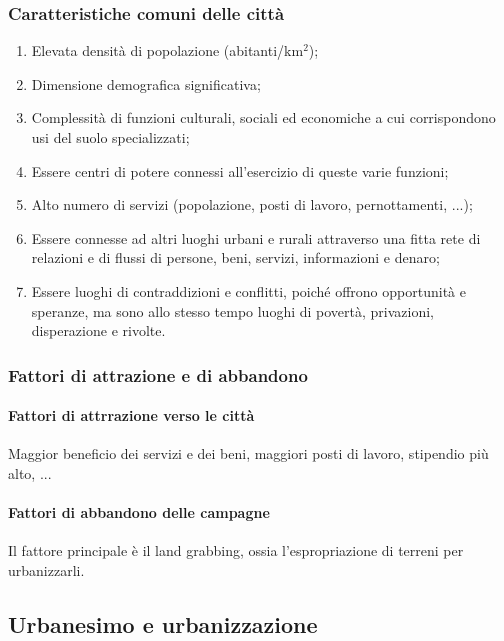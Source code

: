 \documentclass{article}
\begin{document}
\subsubsection{Caratteristiche comuni delle città}
\begin{enumerate}
    \item Elevata densità di popolazione (abitanti/km$^2$);
    \item Dimensione demografica significativa;
    \item Complessità di funzioni culturali, sociali ed economiche a cui corrispondono usi
        del suolo specializzati;
    \item Essere centri di potere connessi all'esercizio di queste varie funzioni;
    \item Alto numero di servizi (popolazione, posti di lavoro, pernottamenti, ...);
    \item Essere connesse ad altri luoghi urbani e rurali attraverso una fitta rete di
        relazioni e di flussi di persone, beni, servizi, informazioni e denaro;
    \item Essere luoghi di contraddizioni e conflitti, poiché offrono opportunità e speranze,
        ma sono allo stesso tempo luoghi di povertà, privazioni, disperazione e rivolte.
\end{enumerate}

\subsubsection{Fattori di attrazione e di abbandono}
\paragraph*{Fattori di attrrazione verso le città} \phantom{}

Maggior beneficio dei servizi e dei beni, maggiori posti di lavoro, stipendio più alto, ...

\paragraph*{Fattori di abbandono delle campagne} \phantom{}

Il fattore principale è il land grabbing, ossia l'espropriazione di terreni per urbanizzarli.

\subsection{Urbanesimo e urbanizzazione}
\end{document}
